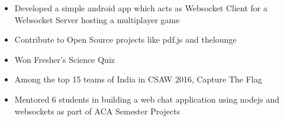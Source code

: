 
\begin{itemize}
  \ifdefined\ONEPAGE
  \else
  \item Developed a simple android app which acts as Websocket Client for a
    Websocket Server hosting a multiplayer game
  \fi
  \item Contribute to Open Source projects like pdf.js and thelounge
  \ifdefined\ONEPAGE
  \else
  \item Won Fresher's Science Quiz
  \fi
  \item Among the top 15 teams of India in CSAW 2016, Capture The Flag
  \ifdefined\ONEPAGE
  \else
  \item Mentored 6 students in building a web chat application using nodejs and
    websockets as part of ACA Semester Projects
  \fi
\end{itemize}